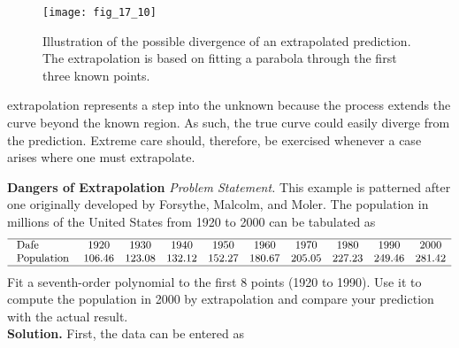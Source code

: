 \documentclass[../main.tex]{subfiles}
\begin{document}
    \begin{figure}[H]
        \centering
        \texttt{[image: fig\_17\_10]}
       \caption{\textsf{Illustration of the possible divergence of an extrapolated prediction. The extrapolation is based
       on fitting a parabola through the first three known points.}}\label{fig:fig_17_10}
    \end{figure}
    extrapolation represents a step into the unknown because the process extends the curve
    beyond the known region. As such, the true curve could easily diverge from the prediction.
    Extreme care should, therefore, be exercised whenever a case arises where one must
    extrapolate.
    \begin{exmp} \textbf{Dangers of Extrapolation}
        \noindent\textit{Problem Statement.}
        This example is patterned after one originally developed by Forsythe,
        Malcolm, and Moler. The population in millions of the United States from 1920 to 2000 can
        be tabulated as
        $$
        \begin{array}{lccccccccc}
            \hline \text { Dafe } & 1920 & 1930 & 1940 & 1950 & 1960 & 1970 & 1980 & 1990 & 2000 \\
            \text { Population } & 106.46 & 123.08 & 132.12 & 152.27 & 180.67 & 205.05 & 227.23 & 249.46 & 281.42 \\
            \hline
            \end{array}
        $$
            Fit a seventh-order polynomial to the first 8 points (1920 to 1990). Use it to compute the
            population in 2000 by extrapolation and compare your prediction with the actual result.\\
        \noindent \textbf{Solution.} First, the data can be entered as


\end{exmp}
\end{document}

